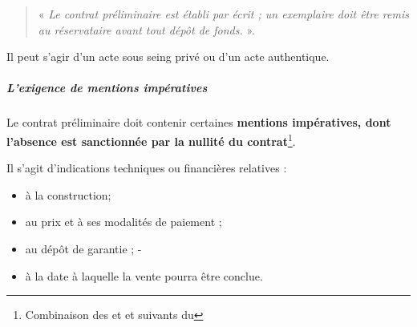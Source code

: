					\begin{quote}
						« {\itshape Le contrat préliminaire est établi par écrit ; un exemplaire doit être remis au réservataire avant tout dépôt de fonds. \lips} ».
					\end{quote}

					Il peut s’agir d’un acte sous seing privé ou d’un acte authentique.


				\subparagraph{L'exigence de mentions impératives}

					Le contrat préliminaire doit contenir certaines \textbf{mentions impératives, dont l’absence est sanctionnée par la nullité du contrat}\footnote{Combinaison des  et  et suivants du \cch}.

					Il s’agit d’indications techniques ou financières relatives :
					\begin{itemize}
						\item à la construction;
						\item au prix et à ses modalités de paiement ;
						\item au dépôt de garantie ;
						-\item à la date à laquelle la vente pourra être conclue.
					\end{itemize}

